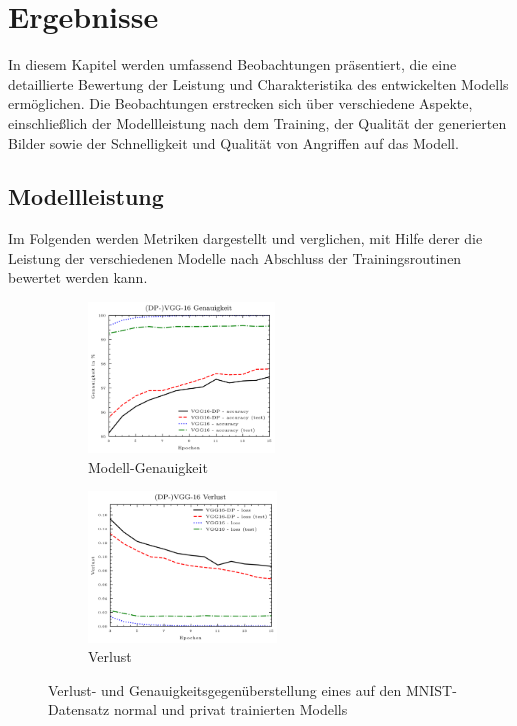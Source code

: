 \chapter{Ergebnisse} \label{chpt:Ergebnisse_Main}
In diesem Kapitel werden umfassend Beobachtungen präsentiert, die eine detaillierte Bewertung der Leistung und Charakteristika des entwickelten Modells ermöglichen. Die Beobachtungen erstrecken sich über verschiedene Aspekte, einschließlich der Modellleistung nach dem Training, der Qualität der generierten Bilder sowie der Schnelligkeit und Qualität von Angriffen auf das Modell.
\section{Modellleistung}
Im Folgenden werden Metriken dargestellt und verglichen, mit Hilfe derer die Leistung der verschiedenen Modelle nach Abschluss der Trainingsroutinen bewertet werden kann.
\begin{figure}[H]
	\centering
	\begin{subfigure}[b]{0.35\linewidth}
		\includegraphics[width=\linewidth, height=4cm]{Bilder/acc.png}
		\caption{Modell-Genauigkeit}
		\label{img:acc_vgg_dp}
	\end{subfigure}
	\hspace{1cm} %
	\begin{subfigure}[b]{0.35\linewidth}
		\includegraphics[width=\linewidth, height=4cm]{Bilder/loss.png}
		\caption{Verlust}
		\label{img:loss_vgg_dp}
	\end{subfigure}
	\caption{Verlust- und Genauigkeitsgegenüberstellung eines auf den MNIST-Datensatz normal und privat trainierten Modells}
	\label{img:mnist_figure}
\end{figure}
